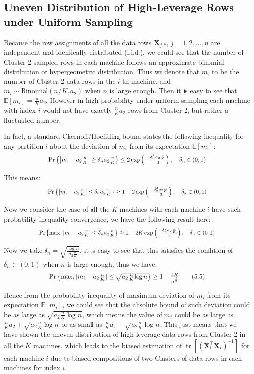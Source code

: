 \documentclass[11pt]{article}
\numberwithin{equation}{section}
\theoremstyle{plain}
\theoremstyle{definition}
\theoremstyle{remark}
\begin{document}
\subsection{Uneven Distribution of High-Leverage Rows under Uniform Sampling}
Because the row assignments of all the data rows $\mathbf{X}_{j,\ast}$, $j = 1, 2, \ldots, n$ are independent and identically distributed (i.i.d.), we could see that the number of Cluster 2 sampled rows in each machine follows an approximate binomial distribution or hypergeometric distribution. Thus we denote that $m_{i}$ to be the number of Cluster 2 data rows in the $i$-th machine, and $m_{i} \sim \text{Binomial}(n/K, a_2)$ when $n$ is large enough.
Then it is easy to see that $\mathbb{E}[m_{i}] = \frac{n}{K}a_2$. However in high probability under uniform sampling each machine with index $i$ would not have exactly $\frac{n}{K}a_2$ rows from Cluster 2, but rather a fluctuated number.

In fact, a standard Chernoff/Hoeffding bound states the following inequality for any partition $i$ about the deviation of $m_{i}$ from its expectation $\mathbb{E}[m_{i}]$:
\[
\scalebox{0.88}{$
\Pr\left\{\left|m_{i}-a_2\frac{n}{K}\right| \geq \delta_{n}a_2\frac{n}{K}\right\} \leq 2\exp\left(-\frac{\delta_{n}^{2}a_2\frac{n}{K}}{3}\right),\quad\delta_{n}\in(0,1)
$}
\]

This means:
\[
\scalebox{0.83}{$
  \Pr\left\{\left|m_{i}-a_2\frac{n}{K}\right| \leq \delta_{n}a_2\frac{n}{K}\right\} \geq 1 - 2\exp\left(-\frac{\delta_{n}^{2}a_2\frac{n}{K}}{3}\right),\quad\delta_{n}\in(0,1)
$}
  \]

Now we consider the case of all the $K$ machines with each machine $i$ have such probability inequality convergence, we have the following result here:
\[
\scalebox{0.83}{$
  \Pr\left\{\max_{i}|m_{i}-a_2\frac{n}{K}| \leq \delta_{n}a_2\frac{n}{K}\right\} \geq 1 - 2K\exp\left(-\frac{\delta_{n}^{2}a_2\frac{n}{K}}{3}\right),\quad\delta_{n}\in(0,1)
$}
\]

Now we take \( \delta_{n} = \sqrt{\frac{\log n}{a_2 \frac{n}{K}}} \), it is easy to see that this satisfies the condition of \( \delta_{n} \in (0,1) \) when \( n \) is large enough, thus we have:
\[
\scalebox{0.93}{$
  \Pr\left\{\max_{i}|m_{i}-a_2\frac{n}{K}| \leq \sqrt{{a_2 \frac{n}{K}}{\log n}}\right\} \geq 1 - \frac{2K}{n^{\frac{1}{3}}}\tag{5.5}\label{eq:5.5}
$}
\]

Hence from the probability inequality of maximum deviation of $m_{i}$ from its expectation $\mathbb{E}[m_{i}]$, we could see that
the absolute bound of such deviation could be as large as $\sqrt{a_2 \frac{n}{K}{\log n}}$, which means the value of $m_{i}$ could be as large as $\frac{n}{K}a_2 + \sqrt{a_2 \frac{n}{K}{\log n}}$ or as small as $\frac{n}{K}a_2 - \sqrt{a_2 \frac{n}{K}{\log n}}$.
This just means that we have shown the uneven distribution of high-leverage data rows from Cluster 2 in all the $K$ machines, which leads to the biased estimation of $\operatorname{tr}[(\mathbf{X}_i^{\top}\mathbf{X}_i)^{-1}]$ for each machine $i$ due to biased compositions of two Clusters of data rows in each machines for index $i$.
\end{document}

